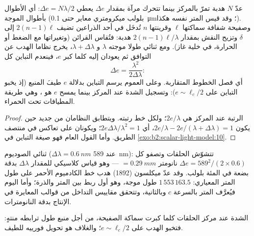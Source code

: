 \begin{proposition}\label{prop:b2:michelson:measure}
عدّ $N$ هدبة تمرّ بالمركز بينما تتحرك مرآة بمقدار $\Delta e$
يعطي $\Delta e = N\lambda/2$: أي الأطوال بأطوال الموجة (بلولب ميكرومتري
معاير حتى \qty{0.1}{\micro m}؛ وقد قيس المتر نفسه هكذا). وصفيحة
شفافة سماكتها $\ell$ وقرينتها $n$ تُدخَل في أحد الذراعين
تضيف $2(n - 1)\ell$ إلى $\delta$ وتزيح النقش بمقدار $2(n - 1)\ell/\lambda$
هدبة: فتُقاس القرائن (وتغيراتها مع الضغط أو الحرارة،
في خلية غاز). ومع ثنائي طولا موجته $\lambda$ و $\lambda + \Delta\lambda$، يخرج
نظاما الهدب عن التوافق ثم يعودان إليه كلما كبر $e$، فينعدم
التباين كل
\[
\Delta e = \frac{\lambda^2}{2\Delta\lambda} :
\]
أي فصل الخطوط المتقاربة. وعلى العموم يرسم التباين بدلالة
$e$ طيفَ المنبع (إذ يخبو التباين على $e \sim \ell_c/2$): وتسجيل الشدة عند المركز بينما
يمسح $e$ هو \emph{}، وهي طريقة
المطيافات تحت الحمراء.
\end{proposition}

\begin{proof}
الرتبة عند المركز هي $2e/\lambda$؛ ولكل خط رتبته. ويتطابق
النظامان من جديد حين يكون $2e/\lambda - 2e/(\lambda + \Delta\lambda) = 1$، أي $2e\Delta\lambda
/\lambda^2 = 1$؛ ويكونان على تعاكس في منتصف الطريق. وأما القول العام فهو
صيغة التباين في \cref{exo:b2:scalar-light-model:10}.
\end{proof}

\begin{example}\label{ex:b2:michelson:sodium}
ثنائي الصوديوم ($\Delta\lambda = \qty{0.6}{nm}$ عند \qty{589}{nm}): تتشوّش الحلقات وتصفو
كل $\Delta e = 589^2/(2 \times 0.6)$ نانومتر $= \qty{0.29}{mm}$ --- وهو قياس كلاسيكي
للمقدار $\Delta\lambda$ بدقة بضعة في المئة بلولب. وقد عدّ ميكلسون (1892)
هدب خط الكادميوم الأحمر على طول المتر
المعياري: $1\,553\,163.5$ طول موجة، وهو أول ربط بين
المتر والذرة؛ وأما اليوم فيُعرَّف المتر بالسرعة $c$ وبالثانية،
وتتحقق مقاييس التداخل من قوالب المعايرة في الإنتاج بدقة
النانومترات.
\end{example}

\begin{omfigure}

{\small الشدة عند مركز الحلقات كلما كبرت سماكة الصفيحة،
من أجل منبع طول ترابطه منتهٍ: فتخبو الهدب على
$e \sim \ell_c/2$؛ والغلاف هو تحويل فورييه للطيف.}
\end{omfigure}

